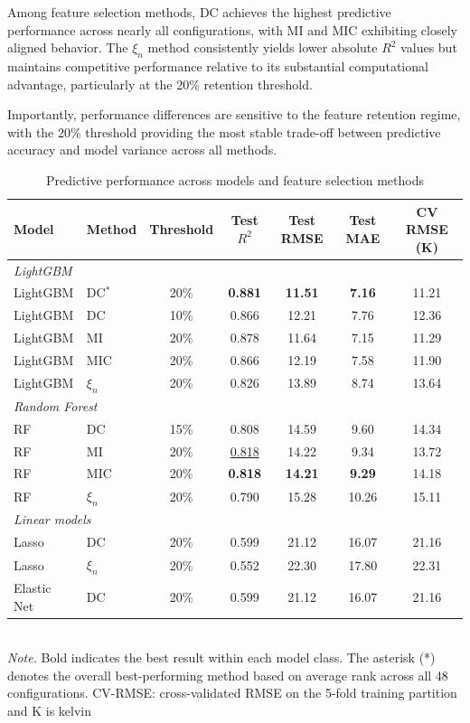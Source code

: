\documentclass[twoside,11pt]{article}
\begin{document}
Among feature selection methods, DC achieves the highest predictive performance across nearly all configurations, with MI and MIC exhibiting closely aligned behavior. The $\xi_n$ method consistently yields lower absolute $R^{2}$ values but maintains competitive performance relative to its substantial computational advantage, particularly at the 20\% retention threshold.

Importantly, performance differences are sensitive to the feature retention regime, with the 20\% threshold providing the most stable trade-off between predictive accuracy and model variance across all methods.

\begin{table}[tp]
\centering
\caption{Predictive performance across models and feature selection methods}
\label{tab:overall_results}
\small
\begin{tabular}{@{}llccccc@{}}
\toprule
Model & Method & Threshold & Test $R^2$ & Test RMSE & Test MAE
  & CV RMSE (K) \\
\midrule
\multicolumn{7}{l}{\textit{LightGBM}} \\
LightGBM & DC$^{*}$       & 20\% & \textbf{0.881} & \textbf{11.51} & \textbf{7.16} & 11.21 \\
LightGBM & DC       & 10\% & 0.866 & 12.21 & 7.76 & 12.36 \\
LightGBM & MI       & 20\% & 0.878 & 11.64 & 7.15 & 11.29 \\
LightGBM & MIC      & 20\% & 0.866 & 12.19 & 7.58 & 11.90 \\
LightGBM & $\xi_n$  & 20\% & 0.826 & 13.89 & 8.74 & 13.64 \\
\midrule
\multicolumn{7}{l}{\textit{Random Forest}} \\
RF & DC       & 15\% & 0.808 & 14.59 & 9.60 & 14.34 \\
RF & MI       & 20\% & \underline{0.818} & 14.22 & 9.34 & 13.72 \\
RF & MIC      & 20\% & \textbf{0.818} & \textbf{14.21} & \textbf{9.29} & 14.18 \\
RF & $\xi_n$  & 20\% & 0.790 & 15.28 & 10.26 & 15.11 \\
\midrule
\multicolumn{7}{l}{\textit{Linear models}} \\
Lasso       & DC      & 20\% & 0.599 & 21.12 & 16.07 & 21.16 \\
Lasso       & $\xi_n$ & 20\% & 0.552 & 22.30 & 17.80 & 22.31 \\
Elastic Net & DC      & 20\% & 0.599 & 21.12 & 16.07 & 21.16 \\
\bottomrule
\end{tabular}
\smallskip\\
{\small\textit{Note.} Bold indicates the best result within each model class. The asterisk (*) denotes the overall best-performing method based on average rank across all 48 configurations. CV-RMSE: cross-validated RMSE on the 5-fold training partition and K is kelvin}
\end{table}
\end{document}
